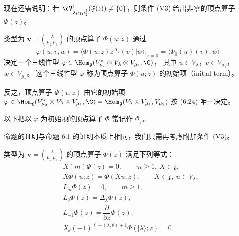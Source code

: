 现在还需说明：若 $\cV^{\dagger}_{\lambda\mu_1\mu_2^{\dagger}}(\mathfrak{F}(z))
\ne\{0\}$，则条件 (V3) 给出非零的顶点算子 $\Phi(z)$。

\begin{proposition}[6.12]
类型为 $\mathbf{v}=\binom{\lambda}{\mu_2\ \mu_1}$ 的顶点算子 $\Phi(u;z)$
通过
\begin{equation}
\varphi(u,v,w)=\langle\Phi(u;z)z^{\hat{\Delta}_{\mathbf{v}}}(v)|w\rangle
\big|_{z=0}=\langle\Phi_0(u)(v),w\rangle \tag{6.24}
\end{equation}
决定一个三线性型
$\varphi\in\Hom_{\mathfrak{g}}(V^{*}_{\mu_2}\otimes V_\lambda\otimes V_{\mu_1},\C)$，
其中 $u\in V_\lambda$，$v\in V_{\mu_1}$，$w\in V_{\mu_2}$。
这个三线性型 $\varphi$ 称为顶点算子 $\Phi(u;z)$ 的初始项（initial term）。

反之，顶点算子 $\Phi(u;z)$ 由它的初始项
$\varphi\in\Hom_{\mathfrak{g}}(V^{*}_{\mu_2}\otimes V_\lambda\otimes V_{\mu_1},\C)
=\Hom_{\mathfrak{g}}(V_\lambda\otimes V_{\mu_1},V_{\mu_2})$
按 (6.24) 唯一决定。
\end{proposition}


以下把以 $\varphi$ 为初始项的顶点算子 $\Phi$ 常记作 $\Phi_\varphi$。

命题的证明与命题 6.1 的证明本质上相同，我们只需再考虑附加条件 (V3)。

\begin{proposition}[6.13]
类型为 $\mathbf{v}=\binom{\lambda}{\mu_2\ \mu_1}$ 的顶点算子 $\Phi(z)$
满足下列等式：
\[
\begin{aligned}
&X(m)\Phi(z)=0,\qquad m\ge1,\ X\in\mathfrak{g},\\
&X\Phi(u;z)=\Phi(Xu;z),\qquad X\in\mathfrak{g},\ u\in V_\lambda,\\
&L_m\Phi(z)=0,\qquad m\ge1,\\
&L_0\Phi(z)=\Delta_\lambda\Phi(z),\\
&L_{-1}\Phi(z)=\dfrac{\partial}{\partial z}\Phi(z),\\
&X_\theta(-1)^{\ell-(\lambda,\theta)+1}\Phi(|\lambda\rangle;z)=0.
\end{aligned}
\]
\end{proposition}


